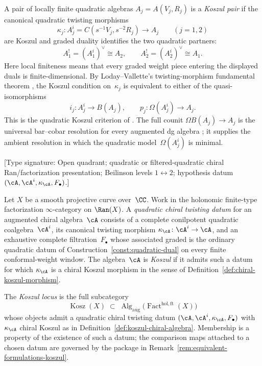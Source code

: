 \begin{definition}
\label{def:koszul-pair-classical}
A pair of locally finite quadratic algebras
$A_j=A(V_j,R_j)$ is a \emph{Koszul pair} if the canonical
quadratic twisting morphisms
\[
 \kappa_j\colon A_j^i=C(s^{-1}V_j,s^{-2}R_j)\longrightarrow A_j
 \qquad (j=1,2)
\]
are Koszul and graded duality identifies the two quadratic partners:
\[
 A_1^!=(A_1^i)^\vee\cong A_2,
 \qquad
 A_2^!=(A_2^i)^\vee\cong A_1.
\]
Here local finiteness means that every graded weight piece entering
the displayed duals is finite-dimensional. By Loday--Vallette's
twisting-morphism fundamental theorem
\cite[Theorem~2.3.2]{LV12}, the Koszul condition on~$\kappa_j$ is
equivalent to either of the quasi-isomorphisms
\[
 i_j\colon A_j^i\longrightarrow B(A_j),
 \qquad
 p_j\colon\Omega(A_j^i)\longrightarrow A_j.
\]
This is the quadratic Koszul criterion of
\cite[Theorem~3.4.6]{LV12}. The full counit
$\Omega B(A_j)\to A_j$ is the universal bar--cobar resolution for
every augmented dg algebra
\cite[Corollary~2.3.4]{LV12}; it supplies the ambient resolution in
which the quadratic model~$\Omega(A_j^i)$ is minimal.
\end{definition}

\begin{definition}
\label{def:koszul-chiral-algebra}
\textup{[Type signature: Open quadrant; quadratic or filtered-quadratic
chiral Ran/factorization presentation; Beilinson levels
$1\leftrightarrow2$; hypothesis datum
$(\cA,\cA^i,\kappa_\cA,F_\bullet)$.]}

Let $X$ be a smooth projective curve over~$\CC$.
Work in the holonomic finite-type factorization
$\infty$-category on $\Ran(X)$. A \emph{quadratic chiral twisting
datum} for an augmented chiral algebra~$\cA$ consists of a complete
conilpotent quadratic coalgebra~$\cA^i$, its canonical twisting
morphism $\kappa_\cA\colon\cA^i\to\cA$, and an exhaustive complete
filtration~$F_\bullet$ whose associated graded is the ordinary
quadratic datum of Construction~\ref{const:quadratic-dual} on every
finite conformal-weight window. The algebra~$\cA$ is \emph{Koszul}
if it admits such a datum for which $\kappa_\cA$ is a chiral Koszul
morphism in the sense of
Definition~\ref{def:chiral-koszul-morphism}.
\end{definition}

\begin{definition}
\label{def:koszul-locus}
The \emph{Koszul locus} is the full subcategory
\[
\operatorname{Kosz}(X)
\;\subset\;
\operatorname{Alg}_{\mathrm{aug}}
\bigl(\operatorname{Fact}^{\mathrm{hol,ft}}(X)\bigr)
\]
whose objects admit a quadratic chiral twisting datum
$(\cA,\cA^i,\kappa_\cA,F_\bullet)$ with $\kappa_\cA$ chiral
Koszul as in Definition~\textup{\ref{def:koszul-chiral-algebra}}.
Membership is a property of the existence of such a datum; the
comparison maps attached to a chosen datum are governed by the
package in Remark~\ref{rem:equivalent-formulations-koszul}.
\end{definition}

